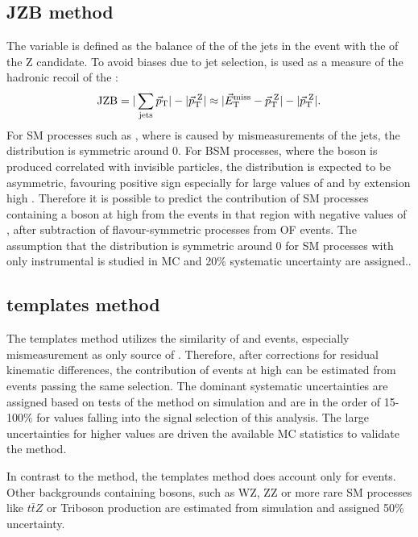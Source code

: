 \subsection{JZB method}
The \JZB variable is defined as the balance of the \pt of the jets in the event with the \pt of the Z candidate. To avoid biases due to jet selection, \METVec is used as a measure of the hadronic recoil of the \Z:
\begin{equation}
\textrm{JZB} = | \sum\limits_{\mathrm{jets}}\vec{p}_{\mathrm{T}}| - | \vec{p}_{\mathrm{T}}^{\text{ }\mathrm{Z}}| \approx | \vec{E}_{\mathrm{T}}^{\mathrm{miss}} -  \vec{p}_{\mathrm{T}}^{\text{ }\mathrm{ Z}}| - |\vec{p}_{\mathrm{T}}^{\text{ }\mathrm{Z}}| .
\end{equation}
For SM processes such as \zjets, where \MET is caused by mismeasurements of the jets, the \JZB distribution is symmetric around 0. For BSM processes, where the \Z boson is produced correlated with invisible particles, the \JZB distribution is expected to be asymmetric, favouring positive sign especially for large values of \JZB and by extension high \MET. Therefore it is possible to predict the contribution of SM processes containing a \Z boson at high \MET from the events in that region with negative values of \JZB, after subtraction of flavour-symmetric processes from OF events. The assumption that the \JZB distribution is symmetric around 0 for SM processes with only instrumental \MET is studied in MC and 20\% systematic uncertainty are assigned..
\subsection{\MET templates method}
The \MET templates method utilizes the similarity of \zjets and \gjets events, especially mismeasurement as only source of \MET. Therefore, after corrections for residual kinematic differences, the contribution of \zjets events at high \MET can be estimated from \gjets events passing the same selection. The dominant systematic uncertainties are assigned based on tests of the method on simulation and are in the order of 15-100\% for \MET values falling into the signal selection of this analysis. The large uncertainties for higher \MET values are driven the available MC statistics to validate the method. 

In contrast to the \JZB method, the \MET templates method does account only for \zjets events. Other backgrounds containing \Z bosons, such as WZ, ZZ or more rare SM processes like $t\bar{t}Z$ or Triboson production are estimated from simulation and assigned 50\% uncertainty. 
